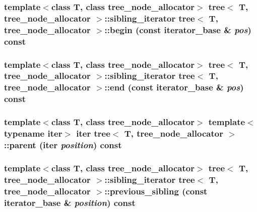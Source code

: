 \hypertarget{classtree_a784ffa6dec85f52754dde8bd6a99aeb}{
\subsubsection{\setlength{\rightskip}{0pt plus 5cm}template$<$class T, class tree\_\-node\_\-allocator$>$ {\bf tree}$<$ T, tree\_\-node\_\-allocator $>$::{\bf sibling\_\-iterator} {\bf tree}$<$ T, tree\_\-node\_\-allocator $>$::begin (const {\bf iterator\_\-base} \& {\em pos}) const}}
\label{classtree_a784ffa6dec85f52754dde8bd6a99aeb}


\hypertarget{classtree_a6aa8b0c6af0f50bfc86592847759127}{
\subsubsection{\setlength{\rightskip}{0pt plus 5cm}template$<$class T, class tree\_\-node\_\-allocator$>$ {\bf tree}$<$ T, tree\_\-node\_\-allocator $>$::{\bf sibling\_\-iterator} {\bf tree}$<$ T, tree\_\-node\_\-allocator $>$::end (const {\bf iterator\_\-base} \& {\em pos}) const}}
\label{classtree_a6aa8b0c6af0f50bfc86592847759127}


\hypertarget{classtree_aaaa1622d2d58ecda846640bd8f8bd28}{
\subsubsection{\setlength{\rightskip}{0pt plus 5cm}template$<$class T, class tree\_\-node\_\-allocator$>$ template$<$typename iter$>$ iter {\bf tree}$<$ T, tree\_\-node\_\-allocator $>$::parent (iter {\em position}) const}}
\label{classtree_aaaa1622d2d58ecda846640bd8f8bd28}


\hypertarget{classtree_a21d6a467bc4d17cfdaf37292c971468}{
\subsubsection{\setlength{\rightskip}{0pt plus 5cm}template$<$class T, class tree\_\-node\_\-allocator$>$ {\bf tree}$<$ T, tree\_\-node\_\-allocator $>$::{\bf sibling\_\-iterator} {\bf tree}$<$ T, tree\_\-node\_\-allocator $>$::previous\_\-sibling (const {\bf iterator\_\-base} \& {\em position}) const}}
\label{classtree_a21d6a467bc4d17cfdaf37292c971468}


